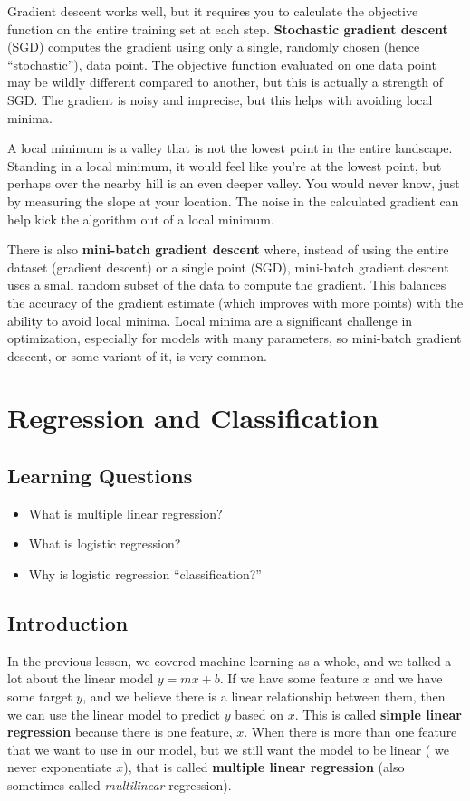 Gradient descent works well, but it requires you to calculate the objective function on the entire training set at each step. \textbf{Stochastic gradient descent} (SGD) computes the gradient using only a single, randomly chosen (hence ``stochastic''), data point. The objective function evaluated on one data point may be wildly different compared to another, but this is actually a strength of SGD. The gradient is noisy and imprecise, but this helps with avoiding local minima.

A local minimum is a valley that is not the lowest point in the entire landscape. Standing in a local minimum, it would feel like you're at the lowest point, but perhaps over the nearby hill is an even deeper valley. You would never know, just by measuring the slope at your location. The noise in the calculated gradient can help kick the algorithm out of a local minimum. 

There is also \textbf{mini-batch gradient descent} where, instead of using the entire dataset (gradient descent) or a single point (SGD), mini-batch gradient descent uses a small random subset of the data to compute the gradient. This balances the accuracy of the gradient estimate (which improves with more points) with the ability to avoid local minima. Local minima are a significant challenge in optimization, especially for models with many parameters, so mini-batch gradient descent, or some variant of it, is very common.

\clearpage
\section{Regression and Classification}
\subsection*{Learning Questions}
\begin{itemize}
    \item What is multiple linear regression?
    \item What is logistic regression?
    \item Why is logistic regression ``classification?''
\end{itemize}

\subsection*{Introduction}
In the previous lesson, we covered machine learning as a whole, and we talked a lot about the linear model $y=mx+b$. If we have some feature $x$ and we have some target $y$, and we believe there is a linear relationship between them, then we can use the linear model to predict $y$ based on $x$. This is called \textbf{simple linear regression} because there is one feature, $x$. When there is more than one feature that we want to use in our model, but we still want the model to be linear (\ie{} we never exponentiate $x$), that is called \textbf{multiple linear regression} (also sometimes called \textit{multilinear} regression).

